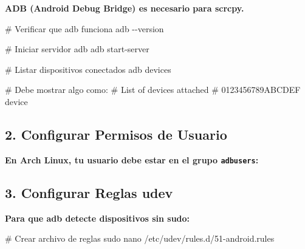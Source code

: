 \documentclass[
  doc,
  floatsintext,
  longtable,
  a4paper,
  nolmodern,
  notxfonts,
  notimes,
  12pt,
  colorlinks=true,linkcolor=blue,citecolor=blue,urlcolor=blue]{apa7}
\newenvironment{Shaded}{\begin{snugshade}}{\end{snugshade}}
\newcommand{\AttributeTok}[1]{\textcolor[rgb]{0.40,0.45,0.13}{#1}}
\newcommand{\CommentTok}[1]{\textcolor[rgb]{0.37,0.37,0.37}{#1}}
\newcommand{\ExtensionTok}[1]{\textcolor[rgb]{0.00,0.23,0.31}{#1}}
\newcommand{\FunctionTok}[1]{\textcolor[rgb]{0.28,0.35,0.67}{#1}}
\newcommand{\KeywordTok}[1]{\textcolor[rgb]{0.00,0.23,0.31}{\textbf{#1}}}
\newcommand{\NormalTok}[1]{\textcolor[rgb]{0.00,0.23,0.31}{#1}}
\newcommand{\VariableTok}[1]{\textcolor[rgb]{0.07,0.07,0.07}{#1}}
\begin{document}
\textbf{ADB (Android Debug Bridge) es necesario para scrcpy.}

\begin{Shaded}
\begin{Highlighting}[]
\CommentTok{\# Verificar que adb funciona}
\ExtensionTok{adb} \AttributeTok{{-}{-}version}

\CommentTok{\# Iniciar servidor adb}
\ExtensionTok{adb}\NormalTok{ start{-}server}

\CommentTok{\# Listar dispositivos conectados}
\ExtensionTok{adb}\NormalTok{ devices}

\CommentTok{\# Debe mostrar algo como:}
\CommentTok{\# List of devices attached}
\CommentTok{\# 0123456789ABCDEF    device}
\end{Highlighting}
\end{Shaded}

\subsection{2. Configurar Permisos de
Usuario}\label{configurar-permisos-de-usuario}

\textbf{En Arch Linux, tu usuario debe estar en el grupo
\texttt{adbusers}:}

\begin{Shaded}
\end{Shaded}

\subsection{3. Configurar Reglas udev}\label{configurar-reglas-udev}

\textbf{Para que adb detecte dispositivos sin sudo:}

\begin{Shaded}
\begin{Highlighting}[]
\CommentTok{\# Crear archivo de reglas}
\FunctionTok{sudo}\NormalTok{ nano /etc/udev/rules.d/51{-}android.rules}
\end{Highlighting}
\end{Shaded}
\end{document}
